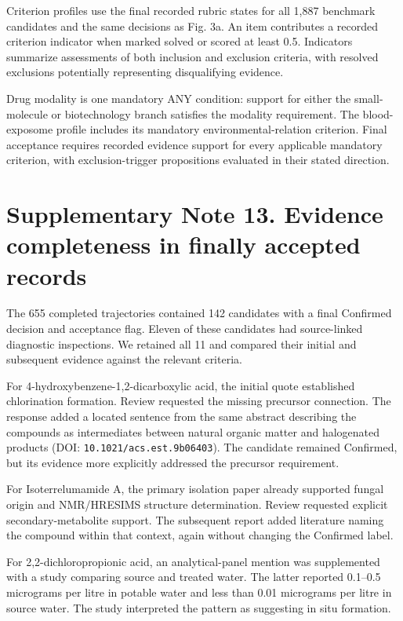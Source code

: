 \documentclass[10pt]{article}
\begin{document}
Criterion profiles use the final recorded rubric states for all 1,887 benchmark candidates and the same decisions as Fig. 3a. An item contributes a recorded criterion indicator when marked solved or scored at least 0.5. Indicators summarize assessments of both inclusion and exclusion criteria, with resolved exclusions potentially representing disqualifying evidence.

Drug modality is one mandatory ANY condition: support for either the small-molecule or biotechnology branch satisfies the modality requirement. The blood-exposome profile includes its mandatory environmental-relation criterion. Final acceptance requires recorded evidence support for every applicable mandatory criterion, with exclusion-trigger propositions evaluated in their stated direction.

\section*{Supplementary Note 13. Evidence completeness in finally accepted records}

The 655 completed trajectories contained 142 candidates with a final Confirmed decision and acceptance flag. Eleven of these candidates had source-linked diagnostic inspections. We retained all 11 and compared their initial and subsequent evidence against the relevant criteria.

For 4-hydroxybenzene-1,2-dicarboxylic acid, the initial quote established chlorination formation. Review requested the missing precursor connection. The response added a located sentence from the same abstract describing the compounds as intermediates between natural organic matter and halogenated products (DOI: \nolinkurl{10.1021/acs.est.9b06403}). The candidate remained Confirmed, but its evidence more explicitly addressed the precursor requirement.

For Isoterrelumamide A, the primary isolation paper already supported fungal origin and NMR/HRESIMS structure determination. Review requested explicit secondary-metabolite support. The subsequent report added literature naming the compound within that context, again without changing the Confirmed label.

For 2,2-dichloropropionic acid, an analytical-panel mention was supplemented with a study comparing source and treated water. The latter reported 0.1--0.5 micrograms per litre in potable water and less than 0.01 micrograms per litre in source water. The study interpreted the pattern as suggesting in situ formation.
\end{document}
